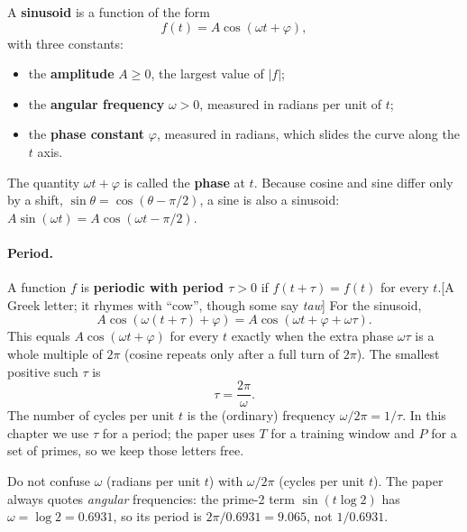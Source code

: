 A \textbf{sinusoid} is a function of the form
\begin{equation}
f(t)=A\cos(\omega t+\varphi),
\label{eq:fourier-series-sinusoid}
\end{equation}
with three constants:
\begin{itemize}
\item the \textbf{amplitude} $A\ge 0$, the largest value of $|f|$;
\item the \textbf{angular frequency} $\omega>0$, measured in radians per unit of $t$;
\item the \textbf{phase constant} $\varphi$, measured in radians, which slides the curve along the $t$ axis.
\end{itemize}
The quantity $\omega t+\varphi$ is called the \textbf{phase} at $t$. Because cosine and sine differ only by a shift, $\sin\theta=\cos(\theta-\pi/2)$, a sine is also a sinusoid: $A\sin(\omega t)=A\cos(\omega t-\pi/2)$.

\paragraph{Period.} A function $f$ is \textbf{periodic with period $\tau>0$} if $f(t+\tau)=f(t)$ for every $t$.[A Greek letter; it rhymes with ``cow'', though some say \emph{taw}] For the sinusoid,
\begin{equation}
A\cos(\omega(t+\tau)+\varphi)=A\cos(\omega t+\varphi+\omega\tau).
\end{equation}
This equals $A\cos(\omega t+\varphi)$ for every $t$ exactly when the extra phase $\omega\tau$ is a whole multiple of $2\pi$ (cosine repeats only after a full turn of $2\pi$). The smallest positive such $\tau$ is
\begin{equation}
\tau=\frac{2\pi}{\omega}.
\label{eq:fourier-series-period}
\end{equation}
The number of cycles per unit $t$ is the (ordinary) frequency $\omega/2\pi=1/\tau$. In this chapter we use $\tau$ for a period; the paper uses $T$ for a training window and $P$ for a set of primes, so we keep those letters free.

\begin{pitfall}
Do not confuse $\omega$ (radians per unit $t$) with $\omega/2\pi$ (cycles per unit $t$). The paper always quotes \emph{angular} frequencies: the prime-2 term $\sin(t\log 2)$ has $\omega=\log 2=0.6931$, so its period is $2\pi/0.6931=9.065$, not $1/0.6931$.
\end{pitfall}

